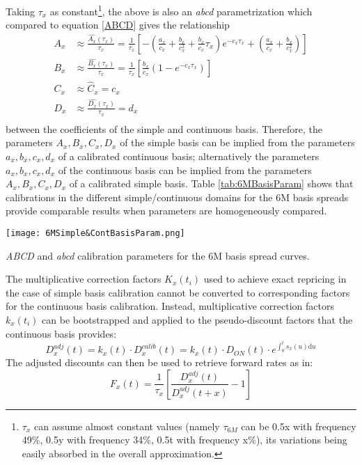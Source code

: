 \documentclass{article}
\begin{document}
Taking $\tau_x$ as constant\footnote{$\tau_x$ can assume almost constant values (namely $\tau_{6M}$ can be 0.5x with frequency 49\%, 0.5y with frequency 34\%, 0.5t with frequency x\%), its variations being easily absorbed in the overall approximation.}, the above is also an \textit{abcd} parametrization which compared to equation \ref{ABCD} gives the relationship
\begin{equation}
\begin{split}
A_x &\approx \frac{\hat{A_x}(\tau_x)}{\tau_x} 
    = \frac{1}{\tau_x} \left[ -\left(\frac{a_x}{c_x}+ \frac{b_x}{c_x^{2}}+\frac{b_x}{c_x}\tau_x \right)e^{-c_x \tau_x}+\left(\frac{a_x}{c_x}+ \frac{b_x}{c_x^{2}}\right) \right] \\
B_x &\approx \frac{\hat{B_x}(\tau_x)}{\tau_x} 
    = \frac{1}{\tau_x} \left[ \frac{b_x}{c_x}\left(1-e^{-c_x \tau_x}\right) \right]\\
C_x &\approx \hat{C}_x = c_x        \\
D_x &\approx \frac{\hat{D_x}(\tau_x)}{\tau_x} = d_x \\
\end{split}
\end{equation}
between the coefficients of the simple and continuous basis. Therefore, the parameters $A_x, B_x, C_x, D_x$ of the simple basis can be implied from the parameters $a_x, b_x, c_x, d_x$ of a calibrated continuous basis; alternatively the parameters $a_x, b_x, c_x, d_x$ of the continuous basis can be implied from the parameters $A_x, B_x, C_x, D_x$ of a calibrated simple basis. Table \ref{tab:6MBasisParam} shows that calibrations in the different simple/continuous domains for the 6M basis spreads provide comparable results when parameters are homogeneously compared.

\begin{table}
\centering
\texttt{[image: 6MSimple\&ContBasisParam.png]}
\caption{\textit{ABCD} and \textit{abcd} calibration parameters for the 6M basis spread curves.}
\label{tab:6MBasisParam}
\end{table}

The multiplicative correction factors $K_x(t_i)$ used to achieve exact repricing in the case of simple basis calibration cannot be converted to corresponding factors for the continuous basis calibration. Instead, multiplicative correction factors $k_x(t_i)$ can be bootstrapped and applied to the pseudo-discount factors that the continuous basis provides:
\begin{equation}
D_x^{adj}(t) = k_x(t) \cdot D_x^{calib}(t) = k_x(t) \cdot D_{ON}(t) \cdot e^{\int_0^{t} s_x(u) \mathrm{d}u}
\end{equation}
The adjusted discounts can then be used to retrieve forward rates as in:
\begin{equation}
F_x(t) = \frac{1}{\tau_x} \left[\frac{D^{adj}_x(t)}{D^{adj}_x(t+x)} - 1 \right]
\end{equation}
\end{document}
